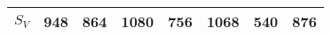 \begin{table}[H]
{\begin{tabular}{|c|r|r|r|r|r|r|l}
    $S_V$ & 948                           & 864                                                 & 1080                                                  & 756                                                 & 1068                                                  & 540                                                   & \multicolumn{1}{r|}{876}             \\ \hline
    \end{tabular}%
    }
    \end{table}